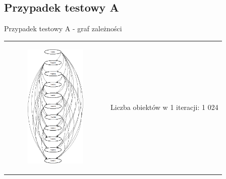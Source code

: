 \documentclass{beamer}
\begin{document}
\subsection*{Przypadek testowy A}

\begin{frame}{Przypadek testowy A - graf zależności}
\begin{table}
     \begin{small}
	\begin{tabular}{ p{7cm} p{2cm} }
	
	\begin{minipage}{.7\textwidth}
\begin{figure}
	\begin{center}
  		\includegraphics[height=6cm]{TestA.png}
	\end{center}
\end{figure}
   	 \end{minipage}
&
	\begin{minipage}{.3\textwidth}
\tiny{Liczba obiektów w 1 iteracji: 1 024}
   	 \end{minipage}

	\end{tabular}
     \end{small}
\end{table}
\end{frame}
\end{document}
